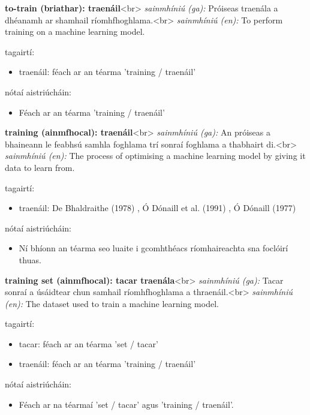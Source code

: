 \documentclass{article}
\begin{document}
\textbf{to-train (briathar): traenáil}<br>
\textit{sainmhíniú (ga):} Próiseas traenála a dhéanamh ar shamhail ríomhfhoghlama.<br>
\textit{sainmhíniú (en):} To perform training on a machine learning model.

tagairtí:
\begin{itemize}
	\item traenáil: féach ar an téarma 'training / traenáil'
\end{itemize}

nótaí aistriúcháin:
\begin{itemize}
	\item Féach ar an téarma 'training / traenáil'
\end{itemize}


\textbf{training (ainmfhocal): traenáil}<br>
\textit{sainmhíniú (ga):} An próiseas a bhaineann le feabhsú samhla foghlama trí sonraí foghlama a thabhairt di.<br>
\textit{sainmhíniú (en):} The process of optimising a machine learning model by giving it data to learn from.

tagairtí:
\begin{itemize}
	\item traenáil: De Bhaldraithe (1978) \cite{de-bhaldraithe}, Ó Dónaill et al. (1991) \cite{focloir-beag}, Ó Dónaill (1977) \cite{odonaill}
\end{itemize}

nótaí aistriúcháin:
\begin{itemize}
	\item Ní bhíonn an téarma seo luaite i gcomhthéacs ríomhaireachta sna foclóirí thuas.
\end{itemize}


\textbf{training set (ainmfhocal): tacar traenála}<br>
\textit{sainmhíniú (ga):} Tacar sonraí a úsáidtear chun samhail ríomhfhoghlama a thraenáil.<br>
\textit{sainmhíniú (en):} The dataset used to train a machine learning model.

tagairtí:
\begin{itemize}
	\item tacar: féach ar an téarma 'set / tacar'
	\item traenáil: féach ar an téarma 'training / traenáil'
\end{itemize}

nótaí aistriúcháin:
\begin{itemize}
	\item Féach ar na téarmaí 'set / tacar' agus 'training / traenáil'.
\end{itemize}
\end{document}
